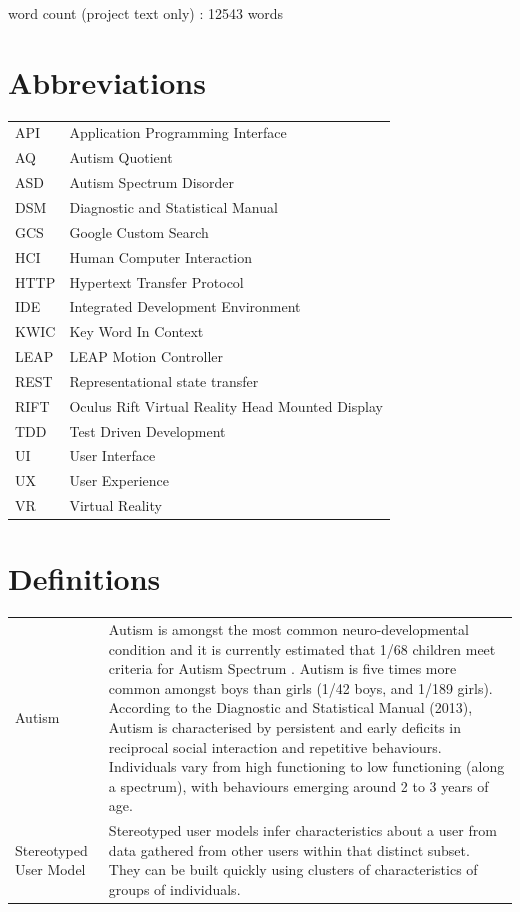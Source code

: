 \documentclass[a4paper, 11pt]{article}
\begin{document}
\begin{center}
word count (project text only) : 12543 words
\end{center}

\clearpage
\tableofcontents
\clearpage

\section*{Abbreviations}
\begin{tabular}{l l }
API & Application Programming Interface\\
AQ & Autism Quotient\\
ASD & Autism Spectrum Disorder\\
DSM & Diagnostic and Statistical Manual\\
GCS & Google Custom Search\\
HCI & Human Computer Interaction\\
HTTP & Hypertext Transfer Protocol\\
IDE & Integrated Development Environment\\
KWIC & Key Word In Context\\
LEAP & LEAP Motion Controller\\
REST & Representational state transfer\\
RIFT & Oculus Rift Virtual Reality Head Mounted Display\\
TDD & Test Driven Development\\
UI & User Interface\\
UX & User Experience\\
VR & Virtual Reality\\
\end{tabular}

\section*{Definitions}

\begin{tabular}{l p{11cm}  }
Autism & Autism is amongst the most common neuro-developmental condition and it is currently estimated that 1/68 children meet criteria for Autism Spectrum \cite{CDC}. Autism is five times more common amongst boys than girls (1/42 boys, and 1/189 girls). According to the Diagnostic and Statistical Manual (2013), Autism is characterised by persistent and early deficits in reciprocal social interaction and repetitive behaviours. Individuals vary from high functioning to low functioning (along a spectrum), with behaviours emerging around 2 to 3 years of age.\\


Stereotyped User Model & Stereotyped user models infer characteristics about a user from data gathered from other users within that distinct subset. They can be built quickly using clusters of characteristics of groups of individuals. 

\end{tabular}
\clearpage
\end{document}
